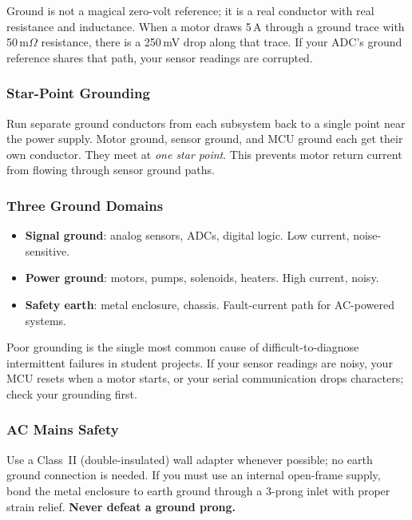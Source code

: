 \documentclass[11pt,letterpaper,twoside,openany]{book}
\begin{document}
Ground is not a magical zero-volt reference; it is a real conductor with real resistance and inductance. When a motor draws 5\,A through a ground trace with 50\,m$\Omega$ resistance, there is a 250\,mV drop along that trace. If your ADC's ground reference shares that path, your sensor readings are corrupted.

\subsubsection{Star-Point Grounding}
Run separate ground conductors from each subsystem back to a single point near the power supply. Motor ground, sensor ground, and MCU ground each get their own conductor. They meet at \emph{one star point}. This prevents motor return current from flowing through sensor ground paths.

\subsubsection{Three Ground Domains}
\begin{itemize}[nosep,leftmargin=1.5em]
  \item \textbf{Signal ground}: analog sensors, ADCs, digital logic. Low current, noise-sensitive.
  \item \textbf{Power ground}: motors, pumps, solenoids, heaters. High current, noisy.
  \item \textbf{Safety earth}: metal enclosure, chassis. Fault-current path for AC-powered systems.
\end{itemize}

\begin{warningbox}
Poor grounding is the single most common cause of difficult-to-diagnose intermittent failures in student projects. If your sensor readings are noisy, your MCU resets when a motor starts, or your serial communication drops characters; check your grounding first.
\end{warningbox}

\subsubsection{AC Mains Safety}
Use a Class~II (double-insulated) wall adapter whenever possible; no earth ground connection is needed. If you must use an internal open-frame supply, bond the metal enclosure to earth ground through a 3-prong inlet with proper strain relief. \textbf{Never defeat a ground prong.}
\end{document}
